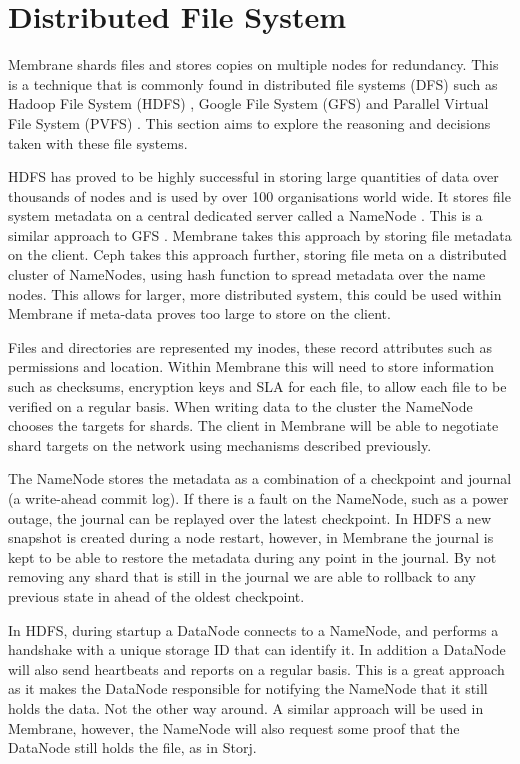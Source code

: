 \documentclass[a4paper, 11pt, twocolumn, twoside]{report}
\begin{document}
\section{Distributed File System}

Membrane shards files and stores copies on multiple nodes for redundancy. This is a technique that is commonly found in distributed file systems (DFS) such as Hadoop File System (HDFS) \citep{hdfsAnalysis}, Google File System (GFS) \citep{TheGFS} and Parallel Virtual File System (PVFS) \citep{ross2000pvfs}. This section aims to explore the reasoning and decisions taken with these file systems.

HDFS has proved to be highly successful in storing large quantities of data over thousands of nodes and is used by over 100 organisations world wide. It stores file system metadata on a central dedicated server called a NameNode \citep{hdfsAnalysis}. This is a similar approach to GFS \citep{mckusick2010gfs}. Membrane takes this approach by storing file metadata on the client. Ceph takes this approach further, storing file meta on a distributed cluster of NameNodes, using hash function to spread metadata over the name nodes. \citep{weil2006ceph} This allows for larger, more distributed system, this could be used within Membrane if meta-data proves too large to store on the client.

Files and directories are represented my inodes, these record attributes such as permissions and location. Within Membrane this will need to store information such as checksums, encryption keys and SLA for each file, to allow each file to be verified on a regular basis. When writing data to the cluster the NameNode chooses the targets for shards. The client in Membrane will be able to negotiate shard targets on the network using mechanisms described previously.

The NameNode stores the metadata as a combination of a checkpoint and journal (a write-ahead commit log). If there is a fault on the NameNode, such as a power outage, the journal can be replayed over the latest checkpoint. In HDFS a new snapshot is created during a node restart, however, in Membrane the journal is kept to be able to restore the metadata during any point in the journal. By not removing any shard that is still in the journal we are able to rollback to any previous state in ahead of the oldest checkpoint.

In HDFS, during startup a DataNode connects to a NameNode, and performs a handshake with a unique storage ID that can identify it. In addition a DataNode will also send heartbeats and reports on a regular basis. \cite{hdfsAnalysis} This is a great approach as it makes the DataNode responsible for notifying the NameNode that it still holds the data. Not the other way around. A similar approach will be used in Membrane, however, the NameNode will also request some proof that the DataNode still holds the file, as in Storj.
\end{document}
